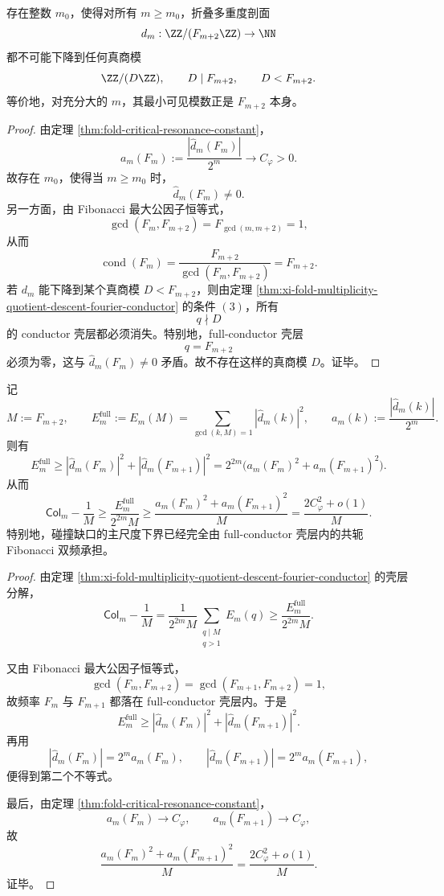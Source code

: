 \begin{corollary}\label{cor:xi-fold-multiplicity-fullmodulus-primitive}
存在整数 \(m_0\)，使得对所有 \(m\ge m_0\)，折叠多重度剖面
\[
d_m:\ZZ/(F_{m+2}\ZZ)\to\NN
\]
都不可能下降到任何真商模
\[
\ZZ/(D\ZZ),
\qquad
D\mid F_{m+2},
\qquad
D<F_{m+2}.
\]
等价地，对充分大的 \(m\)，其最小可见模数正是 \(F_{m+2}\) 本身。
\end{corollary}
\begin{proof}
由定理 \ref{thm:fold-critical-resonance-constant}，
\[
a_m(F_m):=\frac{|\widehat d_m(F_m)|}{2^m}\longrightarrow C_\varphi>0.
\]
故存在 \(m_0\)，使得当 \(m\ge m_0\) 时，
\[
\widehat d_m(F_m)\neq 0.
\]
另一方面，由 Fibonacci 最大公因子恒等式，
\[
\gcd(F_m,F_{m+2})=F_{\gcd(m,m+2)}=1,
\]
从而
\[
\operatorname{cond}(F_m)=\frac{F_{m+2}}{\gcd(F_m,F_{m+2})}=F_{m+2}.
\]
若 \(d_m\) 能下降到某个真商模 \(D<F_{m+2}\)，则由定理
\ref{thm:xi-fold-multiplicity-quotient-descent-fourier-conductor} 的条件 \((3)\)，所有
\[
q\nmid D
\]
的 conductor 壳层都必须消失。特别地，full-conductor 壳层
\[
q=F_{m+2}
\]
必须为零，这与 \(\widehat d_m(F_m)\neq 0\) 矛盾。故不存在这样的真商模 \(D\)。证毕。
\end{proof}

\begin{theorem}\label{thm:xi-full-conductor-shell-collision-gap-fibonacci-pair}
记
\[
M:=F_{m+2},
\qquad
E_m^{\mathrm{full}}:=E_m(M)=\sum_{\gcd(k,M)=1}|\widehat d_m(k)|^2,
\qquad
a_m(k):=\frac{|\widehat d_m(k)|}{2^m}.
\]
则有
\[
E_m^{\mathrm{full}}
\ge
|\widehat d_m(F_m)|^2+|\widehat d_m(F_{m+1})|^2
=
2^{2m}\bigl(a_m(F_m)^2+a_m(F_{m+1})^2\bigr).
\]
从而
\[
\mathsf{Col}_m-\frac1M
\ge
\frac{E_m^{\mathrm{full}}}{2^{2m}M}
\ge
\frac{a_m(F_m)^2+a_m(F_{m+1})^2}{M}
=
\frac{2C_\varphi^2+o(1)}{M}.
\]
特别地，碰撞缺口的主尺度下界已经完全由 full-conductor 壳层内的共轭 Fibonacci 双频承担。
\end{theorem}
\begin{proof}
由定理 \ref{thm:xi-fold-multiplicity-quotient-descent-fourier-conductor} 的壳层分解，
\[
\mathsf{Col}_m-\frac1M
=
\frac{1}{2^{2m}M}\sum_{\substack{q\mid M\\ q>1}}E_m(q)
\ge
\frac{E_m^{\mathrm{full}}}{2^{2m}M}.
\]

又由 Fibonacci 最大公因子恒等式，
\[
\gcd(F_m,F_{m+2})=\gcd(F_{m+1},F_{m+2})=1,
\]
故频率 \(F_m\) 与 \(F_{m+1}\) 都落在 full-conductor 壳层内。于是
\[
E_m^{\mathrm{full}}
\ge
|\widehat d_m(F_m)|^2+|\widehat d_m(F_{m+1})|^2.
\]
再用
\[
|\widehat d_m(F_m)|=2^m a_m(F_m),
\qquad
|\widehat d_m(F_{m+1})|=2^m a_m(F_{m+1}),
\]
便得到第二个不等式。

最后，由定理 \ref{thm:fold-critical-resonance-constant}，
\[
a_m(F_m)\to C_\varphi,
\qquad
a_m(F_{m+1})\to C_\varphi,
\]
故
\[
\frac{a_m(F_m)^2+a_m(F_{m+1})^2}{M}
=
\frac{2C_\varphi^2+o(1)}{M}.
\]
证毕。
\end{proof}

\endinput
